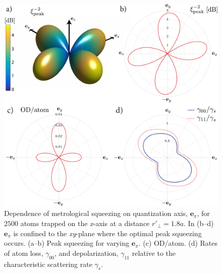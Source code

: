 \documentclass[preprint, aps,pra,onecolumn]{revtex4-1} %
\newcommand{\qaxis}{\mathbf{e}_\pi}
\begin{document}
\begin{figure}
\includegraphics[scale=0.37]{./Figs/Fig_SqueezingQuantAxis}
\caption{Dependence of metrological squeezing on quantization axis, $\qaxis$, for $2500$ atoms trapped on the \emph{x}-axis at a distance $ r'\!_\perp=1.8a$. In (b--d) $\qaxis$ is confined to the \emph{xy}-plane where the optimal peak squeezing occurs.
(a--b) Peak squeezing for varying $\qaxis$. 
(c) OD/atom.
(d) Rates of atom loss, $\gamma_{00}$, and depolarization, $\gamma_{11}$ relative to the characteristic scattering rate $\gamma_s$. }\label{Fig::Squeezing_QuantizationAxis}
\end{figure}
\end{document}
